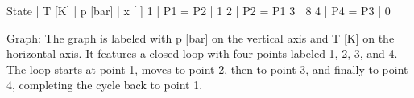 State | T [K] | p [bar] | x [ ]
1 | P1 = P2 | 1
2 | P2 = P1
3 | 8
4 | P4 = P3 | 0

Graph:
The graph is labeled with p [bar] on the vertical axis and T [K] on the horizontal axis. It features a closed loop with four points labeled 1, 2, 3, and 4. The loop starts at point 1, moves to point 2, then to point 3, and finally to point 4, completing the cycle back to point 1.